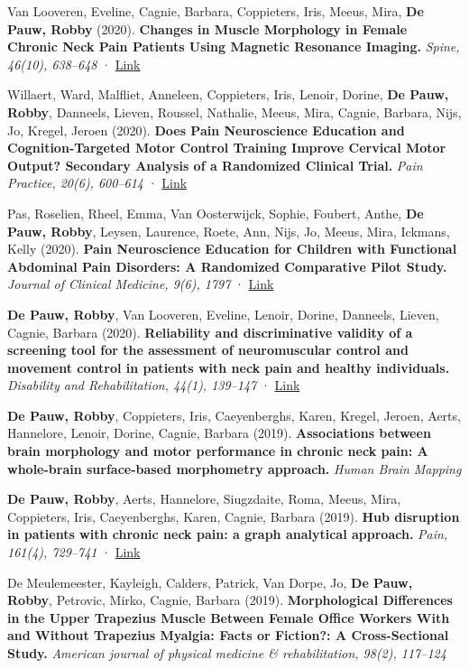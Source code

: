 \documentclass[
  letterpaper,
  DIV=11,
  numbers=noendperiod]{scrartcl}
\begin{document}
Van Looveren, Eveline, Cagnie, Barbara, Coppieters, Iris, Meeus, Mira,
\textbf{De Pauw, Robby} (2020). \textbf{Changes in Muscle Morphology in
Female Chronic Neck Pain Patients Using Magnetic Resonance Imaging.}
\emph{Spine, 46(10), 638--648} ·
\href{http://dx.doi.org/10.1097/BRS.0000000000003856}{Link}

Willaert, Ward, Malfliet, Anneleen, Coppieters, Iris, Lenoir, Dorine,
\textbf{De Pauw, Robby}, Danneels, Lieven, Roussel, Nathalie, Meeus,
Mira, Cagnie, Barbara, Nijs, Jo, Kregel, Jeroen (2020). \textbf{Does
Pain Neuroscience Education and Cognition‐Targeted Motor Control
Training Improve Cervical Motor Output? Secondary Analysis of a
Randomized Clinical Trial.} \emph{Pain Practice, 20(6), 600--614} ·
\href{http://dx.doi.org/10.1111/PAPR.12884}{Link}

Pas, Roselien, Rheel, Emma, Van Oosterwijck, Sophie, Foubert, Anthe,
\textbf{De Pauw, Robby}, Leysen, Laurence, Roete, Ann, Nijs, Jo, Meeus,
Mira, Ickmans, Kelly (2020). \textbf{Pain Neuroscience Education for
Children with Functional Abdominal Pain Disorders: A Randomized
Comparative Pilot Study.} \emph{Journal of Clinical Medicine, 9(6),
1797} · \href{http://dx.doi.org/10.3390/JCM9061797}{Link}

\textbf{De Pauw, Robby}, Van Looveren, Eveline, Lenoir, Dorine,
Danneels, Lieven, Cagnie, Barbara (2020). \textbf{Reliability and
discriminative validity of a screening tool for the assessment of
neuromuscular control and movement control in patients with neck pain
and healthy individuals.} \emph{Disability and Rehabilitation, 44(1),
139--147} · \href{http://dx.doi.org/10.1080/09638288.2020.1760948}{Link}

\textbf{De Pauw, Robby}, Coppieters, Iris, Caeyenberghs, Karen, Kregel,
Jeroen, Aerts, Hannelore, Lenoir, Dorine, Cagnie, Barbara (2019).
\textbf{Associations between brain morphology and motor performance in
chronic neck pain: A whole-brain surface-based morphometry approach.}
\emph{Human Brain Mapping}

\textbf{De Pauw, Robby}, Aerts, Hannelore, Siugzdaite, Roma, Meeus,
Mira, Coppieters, Iris, Caeyenberghs, Karen, Cagnie, Barbara (2019).
\textbf{Hub disruption in patients with chronic neck pain: a graph
analytical approach.} \emph{Pain, 161(4), 729--741} ·
\href{http://dx.doi.org/10.1097/j.pain.0000000000001762}{Link}

De Meulemeester, Kayleigh, Calders, Patrick, Van Dorpe, Jo, \textbf{De
Pauw, Robby}, Petrovic, Mirko, Cagnie, Barbara (2019).
\textbf{Morphological Differences in the Upper Trapezius Muscle Between
Female Office Workers With and Without Trapezius Myalgia: Facts or
Fiction?: A Cross-Sectional Study.} \emph{American journal of physical
medicine \& rehabilitation, 98(2), 117--124}
\end{document}

